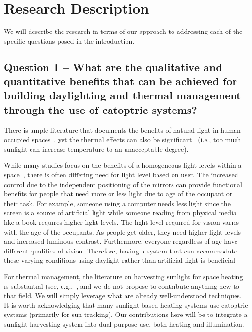 \section{Research Description}
\label{sec:research}

We will describe the research in terms of our approach to addressing each
of the specific questions posed in the introduction.

\subsection{Question 1 -- What are the qualitative and quantitative benefits
that can be achieved for building daylighting and thermal management
through the use of catoptric systems?}

There is ample literature that documents the benefits of natural light in
human-occupied spaces~\cite{Leslie03,ll01,pce00}, yet the thermal effects
can also be significant~\cite{bmbc13} (i.e., too much sunlight can
increase temperature to an unacceptable degree).

While many studies focus on the benefits of a homogeneous light levels
within a space~\cite{azaise13,bwkk15,gb16},
there is often differing need for light level based on user.
The increased control due to the independent positioning of the mirrors
can provide functional benefits for people that need more or less
light due to age of the occupant or their task. For example, someone using
a computer needs less light since the screen is a source of
artificial light while someone reading from physical media like
a book requires higher light levels. The light level required for
vision varies with the age of the occupants. As people get older,
they need higher light levels and increased luminous contrast.
Furthermore, everyone regardless of age have different qualities
of vision. Therefore, having a system that can accommodate these
varying conditions using daylight rather than artificial light is beneficial.

For thermal management, the literature on harvesting sunlight for space
heating is substantial (see, e.g.,~\cite{deW75,Hunt79,kbd76,Lunde80,smf08,wo06},
and we do not propose to contribute anything
new to that field.  We will simply leverage what are already well-understood
techniques. It is worth acknowledging that many sunlight-based heating systems
use catoptric systems (primarily for sun tracking). Our contributions here
will be to integrate a sunlight harvesting system into dual-purpose use, both
heating and illumination.

